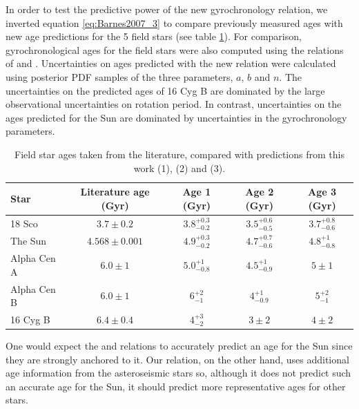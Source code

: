 \documentclass[useAMS, usenatbib]{mn2e}
\begin{document}
In order to test the predictive power of the new gyrochronology relation, we
inverted equation \ref{eq:Barnes2007_3} to compare previously measured ages
with new age predictions for the 5 field stars (see table
\ref{tab:comparison}).
For comparison, gyrochronological ages for the field stars were also computed
using the relations of \citet{Barnes2007} and \citet{Mamajek2008}.
Uncertainties on ages predicted with the new relation were calculated using
posterior PDF samples of the three parameters, $a$, $b$ and $n$.
The uncertainties on the predicted ages of 16 Cyg B are dominated by the large
observational uncertainties on rotation period.
In contrast, uncertainties on the ages predicted for the Sun are dominated by
uncertainties in the gyrochronology parameters.

\begin{table}
\caption{Field star ages taken from the literature, compared with
	predictions from this work (1), \citet{Mamajek2008} (2)
	and \citet{Barnes2007} (3). \label{tab:comparison}}

\begin{tabular}{lcccc}
\hline\hline
{Star} & {Literature age (Gyr)} & {Age 1 (Gyr)} & {Age 2 (Gyr)} & {Age 3 (Gyr)} \\
\hline
18 Sco      & $3.7 \pm 0.2$     & $3.8^{+0.3}_{-0.2}$ & $3.5^{+0.6}_{-0.5}$
	    & $3.7^{+0.8}_{-0.6}$ \\
The Sun     & $4.568 \pm 0.001$ & $4.9^{+0.3}_{-0.2}$ & $4.7^{+0.7}_{-0.6}$
	    & $4.8^{+1}_{-0.8}$ \\
Alpha Cen A & $6.0 \pm 1$       & $5.0^{+1}_{-0.8}$   & $4.5^{+1}_{-0.9}$
	    & $5\pm1$ \\
Alpha Cen B & $6.0 \pm 1$       & $6^{+2}_{-1}$       & $4^{+1}_{-0.9}$
	    & $5^{+2}_{-1}$ \\
16 Cyg B    & $6.4 \pm 0.4$     & $4^{+3}_{-2}$       & $3\pm2$
	    & $4\pm2$ \\
\hline
\end{tabular}
\end{table}

One would expect the \citet{Barnes2007} and \citet{Mamajek2008} relations to
accurately predict an age for the Sun since they are strongly anchored to it.
Our relation, on the other hand, uses additional age information from the
asteroseismic stars so, although it does not predict such an accurate age for
the Sun, it should predict more representative ages for other stars.
\end{document}
